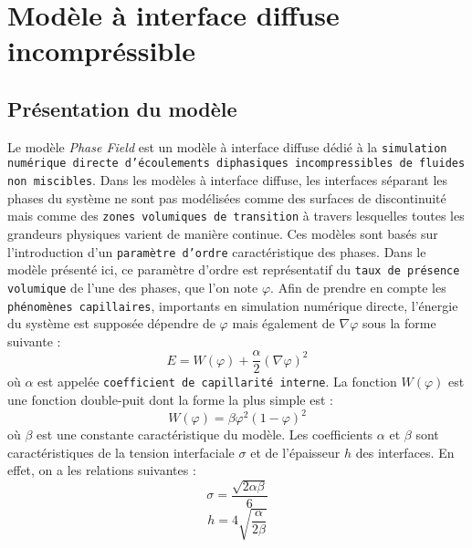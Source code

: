 \newpage
{}
\chapter{\label{sec:PF}Mod\`ele \`a interface diffuse incompr\'essible}

\section{Pr\'esentation du mod\`ele}
Le mod\`ele \textit{Phase Field} est un mod\`ele \`a interface diffuse d\'edi\'e
\`a la \texttt{simulation num\'erique directe d'\'ecoulements diphasiques
incompressibles de fluides non miscibles}. Dans les mod\`eles \`a interface
diffuse, les interfaces s\'eparant les phases du syst\`eme ne sont pas
mod\'elis\'ees comme des surfaces de discontinuit\'e mais comme des
\texttt{zones volumiques de transition} \`a travers lesquelles toutes les
grandeurs physiques varient de mani\`ere continue. Ces mod\`eles sont bas\'es
sur l'introduction d'un \texttt{param\`etre d'ordre} caract\'eristique des
phases. Dans le mod\`ele pr\'esent\'e ici,  ce param\`etre d'ordre est
repr\'esentatif du \texttt{taux de pr\'esence volumique} de l'une des phases,
que l'on note $\varphi$. Afin de prendre en compte les \texttt{ph\'enom\`enes
capillaires}, importants en simulation num\'erique directe, l'\'energie du
syst\`eme est suppos\'ee d\'ependre de $\varphi$ mais \'egalement de $\nabla
\varphi$ sous la forme suivante :
\begin{equation}
E = W\left(\varphi\right)+\frac{\alpha}{2}\left(\nabla \varphi\right)^2
\end{equation}
o\`u $\alpha$ est appel\'ee \texttt{coefficient de capillarit\'e interne}. La
fonction $W\left(\varphi\right)$ est une fonction double-puit dont la forme la plus
simple est :
\begin{equation}
W\left(\varphi\right)=\beta\varphi^2\left(1-\varphi\right)^2
\end{equation}
o\`u $\beta$ est une constante caract\'eristique du mod\`ele.\newline
Les coefficients $\alpha$ et $\beta$ sont caract\'eristiques de la tension
interfaciale $\sigma$ et de l'\'epaisseur $h$ des interfaces. En effet, on a les
relations suivantes :
\begin{equation}
\sigma=\frac{\sqrt{2\alpha\beta}}{6}
\end{equation}
\begin{equation}
h=4\sqrt{\frac{\alpha}{2\beta}}
\end{equation}
